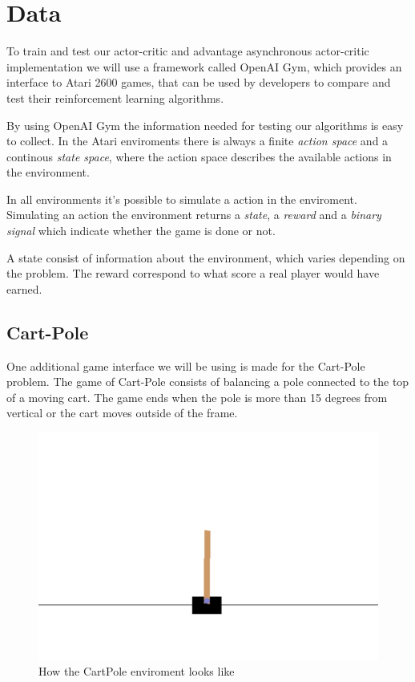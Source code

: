 \documentclass[11pt]{article}
\begin{document}
\maketitle

\section{Data}

To train and test our actor-critic and advantage asynchronous actor-critic implementation we will use a framework called OpenAI Gym, which provides an interface to Atari 2600 games, that can be used by developers to compare and test their reinforcement learning algorithms\cite{openAIGym}.

By using OpenAI Gym the information needed for testing our algorithms is easy to collect. 
In the Atari enviroments there is always a finite \textit{action space} and a continous \textit{state space}, where the action space describes the available actions in the environment.

In all environments it's possible to simulate a action in the enviroment. Simulating an action the environment returns a \textit{state}, a \textit{reward} and a \textit{binary signal} which indicate whether the game is done or not.

A state consist of information about the environment, which varies depending on the problem. The reward correspond to what score a real player would have earned.

\subsection{Cart-Pole}

One additional game interface we will be using is made for the Cart-Pole problem. The game of Cart-Pole consists of balancing a pole connected to the top of a moving cart. The game ends when the pole is more than 15 degrees from vertical or the cart moves outside of the frame.

\begin{figure}[!h]
    \centering
    \includegraphics[scale=0.5]{include/cartpole.png}
    \caption{How the CartPole enviroment looks like}
    \label{fig:layers}
\end{figure}
\end{document}
